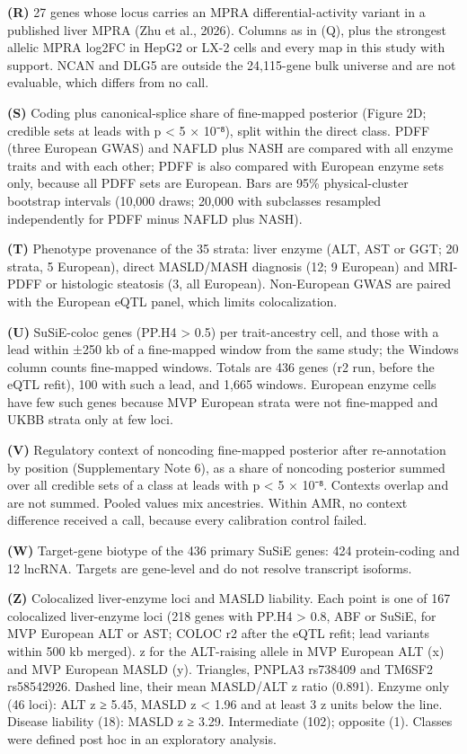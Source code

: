 \textbf{(R)} 27 genes whose locus carries an MPRA differential-activity variant in a published liver MPRA (Zhu et al., 2026). Columns as in (Q), plus the strongest allelic MPRA log2FC in HepG2 or LX-2 cells and every map in this study with support. NCAN and DLG5 are outside the 24,115-gene bulk universe and are not evaluable, which differs from no call.

\textbf{(S)} Coding plus canonical-splice share of fine-mapped posterior (Figure 2D; credible sets at leads with p \textless{} 5 × 10⁻⁸), split within the direct class. PDFF (three European GWAS) and NAFLD plus NASH are compared with all enzyme traits and with each other; PDFF is also compared with European enzyme sets only, because all PDFF sets are European. Bars are 95\% physical-cluster bootstrap intervals (10,000 draws; 20,000 with subclasses resampled independently for PDFF minus NAFLD plus NASH).

\textbf{(T)} Phenotype provenance of the 35 strata: liver enzyme (ALT, AST or GGT; 20 strata, 5 European), direct MASLD/MASH diagnosis (12; 9 European) and MRI-PDFF or histologic steatosis (3, all European). Non-European GWAS are paired with the European eQTL panel, which limits colocalization.

\textbf{(U)} SuSiE-coloc genes (PP.H4 \textgreater{} 0.5) per trait-ancestry cell, and those with a lead within ±250 kb of a fine-mapped window from the same study; the Windows column counts fine-mapped windows. Totals are 436 genes (r2 run, before the eQTL refit), 100 with such a lead, and 1,665 windows. European enzyme cells have few such genes because MVP European strata were not fine-mapped and UKBB strata only at few loci.

\textbf{(V)} Regulatory context of noncoding fine-mapped posterior after re-annotation by position (Supplementary Note 6), as a share of noncoding posterior summed over all credible sets of a class at leads with p \textless{} 5 × 10⁻⁸. Contexts overlap and are not summed. Pooled values mix ancestries. Within AMR, no context difference received a call, because every calibration control failed.

\textbf{(W)} Target-gene biotype of the 436 primary SuSiE genes: 424 protein-coding and 12 lncRNA. Targets are gene-level and do not resolve transcript isoforms.

\textbf{(Z)} Colocalized liver-enzyme loci and MASLD liability. Each point is one of 167 colocalized liver-enzyme loci (218 genes with PP.H4 \textgreater{} 0.8, ABF or SuSiE, for MVP European ALT or AST; COLOC r2 after the eQTL refit; lead variants within 500 kb merged). z for the ALT-raising allele in MVP European ALT (x) and MVP European MASLD (y). Triangles, PNPLA3 rs738409 and TM6SF2 rs58542926. Dashed line, their mean MASLD/ALT z ratio (0.891). Enzyme only (46 loci): ALT z ≥ 5.45, \textbar MASLD z\textbar{} \textless{} 1.96 and at least 3 z units below the line. Disease liability (18): MASLD z ≥ 3.29. Intermediate (102); opposite (1). Classes were defined post hoc in an exploratory analysis.

